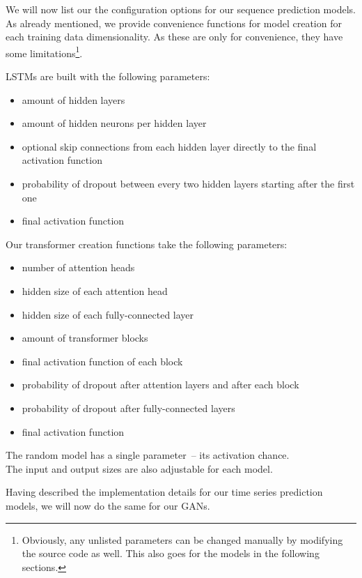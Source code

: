 We will now list our the configuration options for our sequence
prediction models. As already mentioned, we provide convenience
functions for model creation for each training data dimensionality. As
these are only for convenience, they have some
limitations\footnote{Obviously, any unlisted parameters can be changed
  manually by modifying the source code as well. This also goes for
  the models in the following sections.}.

LSTMs are built with the following parameters:
\begin{itemize}
\item amount of hidden layers
\item amount of hidden neurons per hidden layer
\item optional skip connections from each hidden layer directly to the
  final activation function
\item probability of dropout between every two hidden layers starting
  after the first one
\item final activation function
\end{itemize}
Our transformer creation functions take the following parameters:
\begin{itemize}
\item number of attention heads
\item hidden size of each attention head
\item hidden size of each fully-connected layer
\item amount of transformer blocks
\item final activation function of each block
\item probability of dropout after attention layers and after each
  block
\item probability of dropout after fully-connected layers
\item final activation function
\end{itemize}
The random model has a single parameter~-- its activation chance. \\
The input and output sizes are also adjustable for each model.

Having described the implementation details for our time series
prediction models, we will now do the same for our GANs.


